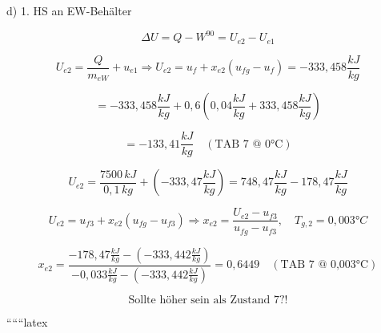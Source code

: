 d) 1. HS an EW-Behälter

\[
\Delta U = Q - W^{90} = U_{e2} - U_{e1}
\]

\[
U_{e2} = \frac{Q}{m_{eW}} + u_{e1} \Rightarrow U_{e2} = u_{f} + x_{e2} (u_{fg} - u_{f}) = -333,458 \frac{kJ}{kg}
\]

\[
= -333,458 \frac{kJ}{kg} + 0,6 (0,04 \frac{kJ}{kg} + 333,458 \frac{kJ}{kg})
\]

\[
= -133,41 \frac{kJ}{kg} \quad (\text{TAB 7 @ 0°C})
\]

\[
U_{e2} = \frac{7500 \, kJ}{0,1 \, kg} + (-333,47 \frac{kJ}{kg}) = 748,47 \frac{kJ}{kg} - 178,47 \frac{kJ}{kg}
\]

\[
U_{e2} = u_{f3} + x_{e2} (u_{fg} - u_{f3}) \Rightarrow x_{e2} = \frac{U_{e2} - u_{f3}}{u_{fg} - u_{f3}}, \quad T_{g,2} = 0,003°C
\]

\[
x_{e2} = \frac{-178,47 \frac{kJ}{kg} - (-333,442 \frac{kJ}{kg})}{-0,033 \frac{kJ}{kg} - (-333,442 \frac{kJ}{kg})} = 0,6449 \quad (\text{TAB 7 @ 0,003°C})
\]

\[
\text{Sollte höher sein als Zustand 7?!}
\]

``````latex


